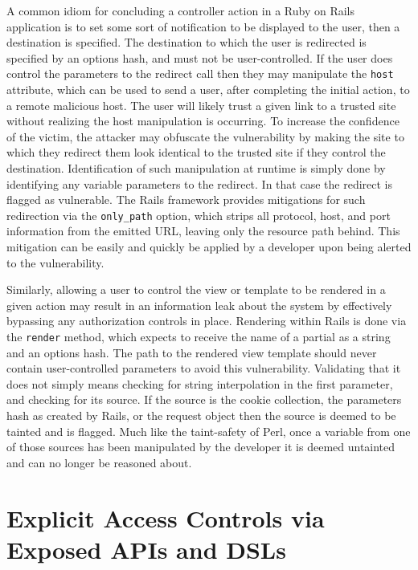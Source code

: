 \documentclass[conference]{IEEEtran}
\begin{document}
A common idiom for concluding a controller action in a Ruby on Rails application
is to set some sort of notification to be displayed to the user, then a
destination is specified.  The destination to which the user is redirected is
specified by an options hash, and must not be user-controlled.  If the user does control the
parameters to the redirect call then they may manipulate the \texttt{host} attribute,
which can be used to send a user, after completing the initial action, to a remote
malicious host\cite{OWASP_redirect}.  The user will likely trust a given link to a trusted
site without realizing the host manipulation is occurring. To increase the confidence of
the victim, the attacker may obfuscate the vulnerability by making the site to which they
redirect them look identical to the trusted site if they control the destination.
Identification of such manipulation at runtime is simply done by identifying any variable
parameters to the redirect.  In that case the redirect is flagged as vulnerable.  The
Rails framework provides mitigations for such redirection via the \texttt{only\_path}
option, which strips all protocol, host, and port information from the emitted
URL, leaving only the resource path behind. This mitigation can be easily and
quickly be applied by a developer upon being alerted to the vulnerability.

Similarly, allowing a user to control the view or template to be rendered in a given
action may result in an information leak about the system by effectively bypassing any
authorization controls in place.  Rendering within Rails is done via the
\texttt{render}\cite{render_method} method, which expects to receive the name of a partial
as a string and an options hash.  The path to the rendered view template should never
contain user-controlled parameters to avoid this vulnerability.  Validating that it does
not simply means checking for string interpolation in the first parameter, and checking
for its source.  If the source is the cookie collection, the parameters hash as created by
Rails, or the request object then the source is deemed to be tainted and is flagged.  Much
like the taint-safety of Perl, once a variable from one of those sources has been
manipulated by the developer it is deemed untainted and can no longer be reasoned about.

\section{Explicit Access Controls via Exposed APIs and DSLs}
\end{document}
